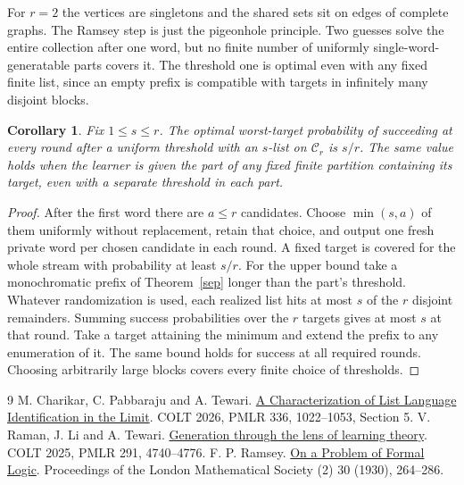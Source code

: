 \documentclass[11pt]{article}
\newtheorem{corollary}[theorem]{Corollary}
\newcommand{\C}{\mathcal C}
\begin{document}
For $r=2$ the vertices are singletons and the shared sets sit on edges of complete graphs. The Ramsey step is just the pigeonhole principle. Two guesses solve the entire collection after one word, but no finite number of uniformly single-word-generatable parts covers it. The threshold one is optimal even with any fixed finite list, since an empty prefix is compatible with targets in infinitely many disjoint blocks.

\begin{corollary}\label{rand}
Fix $1\le s\le r$. The optimal worst-target probability of succeeding at every round after a uniform threshold with an $s$-list on $\C_r$ is $s/r$. The same value holds when the learner is given the part of any fixed finite partition containing its target, even with a separate threshold in each part.
\end{corollary}
\begin{proof}
After the first word there are $a\le r$ candidates. Choose $\min(s,a)$ of them uniformly without replacement, retain that choice, and output one fresh private word per chosen candidate in each round. A fixed target is covered for the whole stream with probability at least $s/r$.
For the upper bound take a monochromatic prefix of Theorem~\ref{sep} longer than the part's threshold. Whatever randomization is used, each realized list hits at most $s$ of the $r$ disjoint remainders. Summing success probabilities over the $r$ targets gives at most $s$ at that round. Take a target attaining the minimum and extend the prefix to any enumeration of it. The same bound holds for success at all required rounds. Choosing arbitrarily large blocks covers every finite choice of thresholds.
\end{proof}

\begin{thebibliography}{9}
 M. Charikar, C. Pabbaraju and A. Tewari.
\href{https://proceedings.mlr.press/v336/charikar26a.html}{A Characterization of List Language Identification in the Limit}.
COLT 2026, PMLR 336, 1022--1053, Section 5.
 V. Raman, J. Li and A. Tewari.
\href{https://proceedings.mlr.press/v291/raman25a.html}{Generation through the lens of learning theory}.
COLT 2025, PMLR 291, 4740--4776.
 F. P. Ramsey. \href{https://doi.org/10.1112/plms/s2-30.1.264}{On a Problem of Formal Logic}. Proceedings of the London Mathematical Society (2) 30 (1930), 264--286.
\end{thebibliography}
\end{document}
